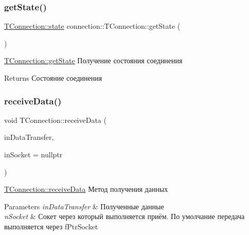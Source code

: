 \subsubsection{\texorpdfstring{get\+State()}{getState()}}
{\footnotesize\ttfamily \hyperlink{classconnection_1_1_t_connection_aee7dfb7510592bd2697ab6f906b9612c}{T\+Connection\+::state} connection\+::\+T\+Connection\+::get\+State (\begin{DoxyParamCaption}{ }\end{DoxyParamCaption})}



\hyperlink{classconnection_1_1_t_connection_a23088724b46efeed0ae8d0d6b1e738b1}{T\+Connection\+::get\+State} Получение состояния соединения 

\begin{DoxyReturn}{Returns}
Состояние соединения 
\end{DoxyReturn}
\mbox{\label{classconnection_1_1_t_connection_aa55500363892831d9764496cd63cec73}} 
\subsubsection{\texorpdfstring{receive\+Data()}{receiveData()}}
{\footnotesize\ttfamily void T\+Connection\+::receive\+Data (\begin{DoxyParamCaption}\item[{\hyperlink{structconnection_1_1_t_data_transfer}{T\+Data\+Transfer} \&}]{in\+Data\+Transfer,  }\item[{const std\+::shared\+\_\+ptr$<$ Q\+Tcp\+Socket $>$}]{in\+Socket = {\ttfamily nullptr} }\end{DoxyParamCaption})}



\hyperlink{classconnection_1_1_t_connection_aa55500363892831d9764496cd63cec73}{T\+Connection\+::receive\+Data} Метод получения данных 


\begin{DoxyParams}{Parameters}
{\em in\+Data\+Transfer} & Полученные данные \\
\hline
{\em n\+Socket} & Сокет через который выполняется приём. По умолчание передача выполняется через f\+Ptr\+Socket \\
\hline
\end{DoxyParams}
\mbox{\label{classconnection_1_1_t_connection_acf6af6c583b67379f8aa1efb4ab9e79e}} 
